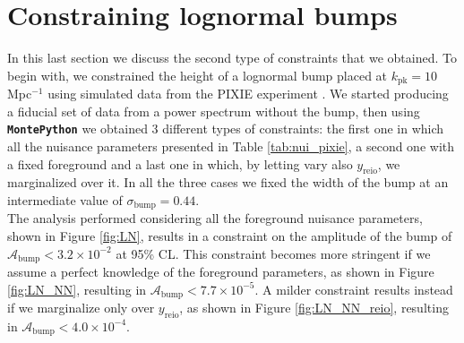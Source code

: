 \section{Constraining lognormal bumps}
In this last section we discuss the second type of constraints that we obtained. To begin with, we constrained the height of a lognormal bump placed at $k_\text{pk}=10$ Mpc$^{-1}$ using simulated data from the PIXIE experiment \cite{pixie}. We started producing a fiducial set of data from a power spectrum without the bump, then using \textbf{\texttt{MontePython}} we obtained 3 different types of constraints: the first one in which all the nuisance parameters presented in Table \ref{tab:nui_pixie}, a second one with a fixed foreground and a last one in which, by letting vary also $y_\text{reio}$, we marginalized over it.  In all the three cases we fixed the width of the bump at an intermediate value of $\sigma_\text{bump}=0.44$.\\
The analysis performed considering all the foreground nuisance parameters, shown in Figure \ref{fig:LN}, results in a constraint on the amplitude of the bump of $\mathcal{A}_\text{bump}<3.2\times10^{-2}$ at 95\% CL. This constraint becomes more stringent if we assume a perfect knowledge of the foreground parameters, as shown in Figure \ref{fig:LN_NN}, resulting in $\mathcal{A}_\text{bump}<7.7\times10^{-5}$. A milder constraint results instead if we marginalize only over $y_\text{reio}$, as shown in Figure \ref{fig:LN_NN_reio}, resulting in $\mathcal{A}_\text{bump}<4.0\times10^{-4}$.\\ 
